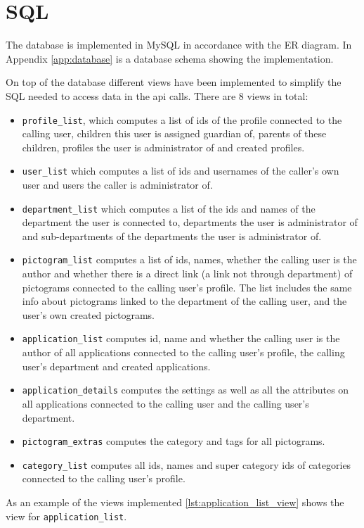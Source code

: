\section{SQL}
The database is implemented in MySQL in accordance with the ER diagram. In Appendix \ref{app:database} is a database schema showing the implementation.

On top of the database different views have been implemented to simplify the SQL needed to access data in the \ac{api} calls. 
There are 8 views in total:
\begin{itemize}
\item \lstinline|profile_list|, which computes a list of ids of the profile connected to the calling user, children this user is assigned guardian of, parents of these children, profiles the user is administrator of and created profiles. 
\item \lstinline|user_list| which computes a list of ids and usernames of the caller's own user and users the caller is administrator of.
\item \lstinline|department_list| which computes a list of the ids and names of the department the user is connected to, departments the user is administrator of and sub-departments of the departments the user is administrator of.
\item \lstinline|pictogram_list| computes a list of ids, names, whether the calling user is the author and whether there is a direct link (a link not through department) of pictograms connected to the calling user's profile. The list includes the same info about pictograms linked to the department of the calling user, and the user's own created pictograms.
\item \lstinline|application_list| computes id, name and whether the calling user is the author of all applications connected to the calling user's profile, the calling user's department and created applications.
\item \lstinline|application_details| computes the settings as well as all the attributes on all applications connected to the calling user and the calling user's department.
\item \lstinline|pictogram_extras| computes the category and tags for all pictograms.
\item \lstinline|category_list| computes all ids, names and super category ids of categories connected to the calling user's profile.
\end{itemize}

As an example of the views implemented \autoref{lst:application_list_view} shows the view for \lstinline|application_list|.

